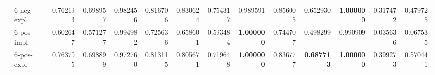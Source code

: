 \begin{tabular}{ll|rrrr|rrrr|rrrr}
 & 6-neg-expl & 0.762193 & 0.698957 & 0.982456 & 0.816706 & 0.830624 & 0.754317 & 0.989591 & 0.856005 & 0.652930 & \bfseries 1.000000 & 0.317472 & 0.479725 \\
 & 6-pos-impl & 0.602647 & 0.571277 & 0.994982 & 0.725636 & 0.658601 & 0.593484 & \bfseries 1.000000 & 0.744707 & 0.498299 & 0.990909 & 0.035636 & 0.067535 \\
 & 6-pos-expl & 0.763705 & 0.698899 & 0.972760 & 0.813115 & 0.805671 & 0.719648 & \bfseries 1.000000 & 0.836777 & \bfseries 0.687713 & \bfseries 1.000000 & 0.399273 & 0.570441 \\
\end{tabular}
